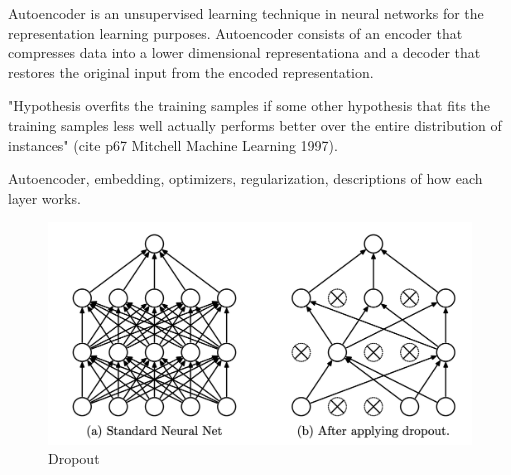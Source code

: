 \begin{definition}[Autoencoder]
	Autoencoder is an unsupervised learning technique in neural networks for the representation learning purposes. Autoencoder consists of an encoder that compresses data into a lower dimensional representationa and a decoder that restores the original input from the encoded representation.
\end{definition}

\begin{definition}[Overfitting]
    "Hypothesis overfits the training samples if some other hypothesis that fits the training samples less well actually performs better over the entire distribution of instances" (cite p67 Mitchell Machine Learning 1997).
\end{definition}

Autoencoder, embedding, optimizers, regularization, descriptions of how each layer works.

\begin{figure}[htb]
	\begin{center}
		\includegraphics[width=0.8\linewidth]{bilder/dropout.png}
		\caption{Dropout}\label{fig:dropout}
	\end{center}
\end{figure}
